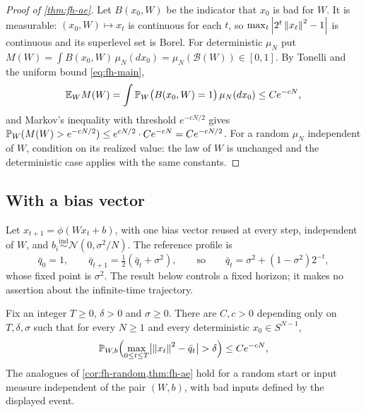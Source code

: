 \begin{proof}[Proof of \cref{thm:fh-ae}]
Let $B(x_0,W)$ be the indicator that $x_0$ is bad for $W$. It is measurable: $(x_0,W)\mapsto x_t$ is continuous for each $t$, so $\max_t\left\lvert 2^t\left\lVert x_t\right\rVert^2-1\right\rvert$ is continuous and its superlevel set is Borel. For deterministic $\mu_N$ put $M(W)=\int B(x_0,W)\,\mu_N(dx_0)=\mu_N(\mathcal B(W))\in[0,1]$. By Tonelli and the uniform bound \cref{eq:fh-main},
\[
\mathbb{E}_WM(W)=\int\mathbb{P}_W\bigl(B(x_0,W)=1\bigr)\,\mu_N(dx_0)\le Ce^{-cN},
\]
and Markov's inequality with threshold $e^{-cN/2}$ gives $\mathbb{P}_W(M(W)>e^{-cN/2})\le e^{cN/2}\cdot Ce^{-cN}=Ce^{-cN/2}$. For a random $\mu_N$ independent of $W$, condition on its realized value: the law of $W$ is unchanged and the deterministic case applies with the same constants.
\end{proof}

\subsection{With a bias vector}

Let $x_{t+1}=\phi(Wx_t+b)$, with one bias vector reused at every step, independent of $W$, and $b_i\overset{\mathrm{ind}}{\sim}\mathcal N(0,\sigma^2/N)$. The reference profile is
\[
\bar q_0=1,\qquad\bar q_{t+1}=\tfrac12(\bar q_t+\sigma^2),\qquad\text{so}\qquad\bar q_t=\sigma^2+(1-\sigma^2)2^{-t},
\]
whose fixed point is $\sigma^2$. The result below controls a fixed horizon; it makes no assertion about the infinite-time trajectory.

\begin{theorem}\label{thm:fh-bias}
Fix an integer $T\ge0$, $\delta>0$ and $\sigma\ge0$. There are $C,c>0$ depending only on $T,\delta,\sigma$ such that for every $N\ge1$ and every deterministic $x_0\in S^{N-1}$,
\[
\PP_{W,b}\Bigl(\max_{0\le t\le T}\bigl|\norm{x_t}^2-\bar q_t\bigr|>\delta\Bigr)\le Ce^{-cN},
\]
The analogues of \cref{cor:fh-random,thm:fh-ae} hold for a random start or input measure independent of the pair $(W,b)$, with bad inputs defined by the displayed event.
\end{theorem}


